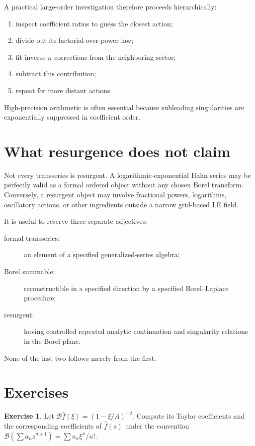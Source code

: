 \documentclass[11pt,openany]{book}
\theoremstyle{definition}
\newtheorem{exercise}{Exercise}[chapter]
\theoremstyle{plain}
\theoremstyle{remark}
\newcommand{\trans}[1]{\widehat{#1}}
\newcommand{\Borel}{\mathcal{B}}
\begin{document}
A practical large-order investigation therefore proceeds hierarchically:
\begin{enumerate}
 \item inspect coefficient ratios to guess the closest action;
 \item divide out its factorial-over-power law;
 \item fit inverse-$n$ corrections from the neighboring sector;
 \item subtract this contribution;
 \item repeat for more distant actions.
\end{enumerate}
High-precision arithmetic is often essential because subleading singularities are exponentially suppressed in coefficient order.

\section{What resurgence does not claim}

Not every transseries is resurgent. A logarithmic-exponential Hahn series may be perfectly valid as a formal ordered object without any chosen Borel transform. Conversely, a resurgent object may involve fractional powers, logarithms, oscillatory actions, or other ingredients outside a narrow grid-based LE field.

It is useful to reserve three separate adjectives:
\begin{description}
 \item[formal transseries:] an element of a specified generalized-series algebra;
 \item[Borel summable:] reconstructible in a specified direction by a specified Borel--Laplace procedure;
 \item[resurgent:] having controlled repeated analytic continuation and singularity relations in the Borel plane.
\end{description}
None of the last two follows merely from the first.

\section{Exercises}

\begin{exercise}
Let $\Borel\trans f(\xi)=(1-\xi/A)^{-2}$. Compute its Taylor coefficients and the corresponding coefficients of $\trans f(z)$ under the convention $\Borel(\sum a_nz^{n+1})=\sum a_n\xi^n/n!$.
\end{exercise}
\end{document}
